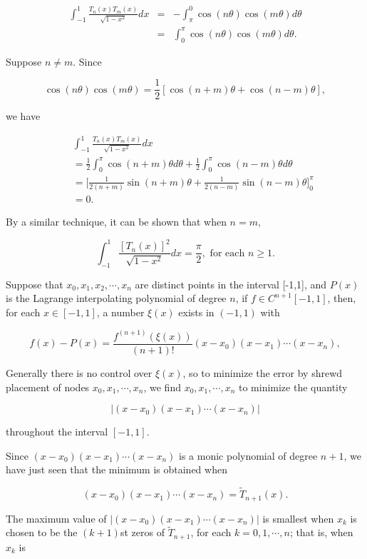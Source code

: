 \documentclass[preprint,12pt]{elsarticle}
\begin{document}
\begin{eqnarray*}
\int_{-1}^1 \frac{T_n(x)T_m(x)}{\sqrt{1-x^2}}dx &=&-\int_{\pi}^0
\cos(n\theta)\cos(m\theta)d\theta\\
&=&\int_0^{\pi} \cos(n\theta)\cos(m\theta)d\theta.
\end{eqnarray*}

Suppose $n\ne m$. Since

\[
\cos(n\theta)\cos(m\theta)=\frac{1}{2}[\cos(n+m)\theta+\cos(n-m)\theta],
\]

we have

\begin{eqnarray*}
  &&\int_{-1}^1 \frac{T_n(x)T_m(x)}{\sqrt{1-x^2}}dx \\
  &&= \frac{1}{2}\int_0^{\pi}\cos(n+m)\theta d\theta+\frac{1}{2}\int_0^{\pi}\cos(n-m)\theta d\theta  \\
   &&= \biggl[\frac{1}{2(n+m)}\sin(n+m)\theta+\frac{1}{2(n-m)}\sin(n-m)\theta\biggr]_0^{\pi} \\[5pt]
   &&= 0.
\end{eqnarray*}

By a similar technique, it can be shown that when $n = m,$

\[
\int_{-1}^1 \frac{[T_n(x)]^2}{\sqrt{1-x^2}}dx=\frac{\pi}{2},
\text{ for each } n\ge 1.
\]

Suppose that $x_0,x_1,x_2,\cdots, x_n$ are distinct points in the interval [-1,1], and $P(x)$ is the Lagrange interpolating polynomial of degree $n$, if $f\in C^{n+1}[-1,1]$, then, for each $x\in [-1,1]$, a number $\xi(x)$ exists in $(-1,1)$ with
 
\[
f(x)-P(x)=\frac{f^{(n+1)}(\xi(x))}{(n+1)!}(x-x_0)(x-x_1)\cdots
(x-x_n),
\]

Generally there is no control over $\xi(x)$, so to minimize the error by shrewd placement of nodes $x_0,x_1,\cdots,x_n$, we find $x_0,x_1,\cdots,x_n$ to minimize the quantity

\[
|(x-x_0)(x-x_1)\cdots (x-x_n)|
\]

throughout the interval $[-1,1]$.

Since $(x-x_0)(x-x_1)\cdots (x-x_n)$ is a monic polynomial of degree $n+1$, we have just seen that the minimum is obtained when

\[
(x-x_0)(x-x_1)\cdots (x-x_n)=\tilde{T}_{n+1}(x).
\]

The maximum value of $|(x-x_0)(x-x_1)\cdots (x-x_n)|$ is smallest when $x_k$ is chosen to be the $(k+1)$st zeros of $\tilde{T}_{n+1}$, for each $k=0,1,\cdots,n$; that is, when $x_k$ is
\end{document}
